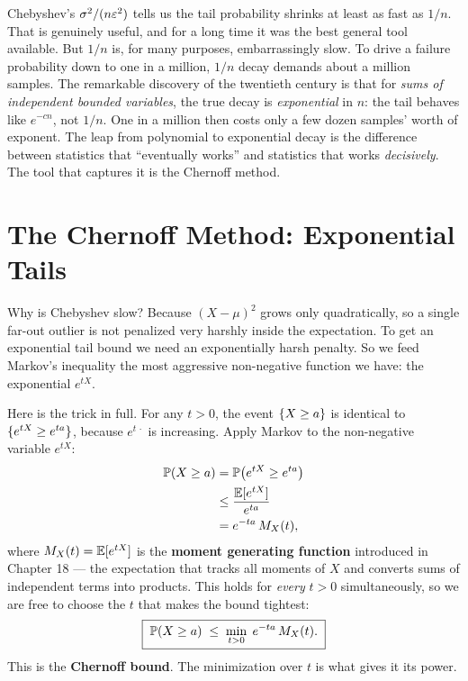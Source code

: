 \begin{aestheticbox}
Chebyshev's $\sigma^2/(n\eps^2)$ tells us the tail probability shrinks at least
as fast as $1/n$. That is genuinely useful, and for a long time it was the best
general tool available. But $1/n$ is, for many purposes, embarrassingly slow.
To drive a failure probability down to one in a million, $1/n$ decay demands
about a million samples. The remarkable discovery of the twentieth century is
that for \emph{sums of independent bounded variables}, the true decay is
\emph{exponential} in $n$: the tail behaves like $e^{-cn}$, not $1/n$. One in a
million then costs only a few dozen samples' worth of exponent. The leap from
polynomial to exponential decay is the difference between statistics that
``eventually works'' and statistics that works \emph{decisively}. The tool
that captures it is the Chernoff method.
\end{aestheticbox}

\section{The Chernoff Method: Exponential Tails}
\label{ch19:chernoff}

Why is Chebyshev slow? Because $(X-\mu)^2$ grows only quadratically, so a
single far-out outlier is not penalized very harshly inside the expectation.
To get an exponential tail bound we need an exponentially harsh penalty. So we
feed Markov's inequality the most aggressive non-negative function we have:
the exponential $e^{tX}$.

Here is the trick in full. For any $t > 0$, the event $\set{X \ge a}$ is
identical to $\set{e^{tX} \ge e^{ta}}$, because $e^{t\,\cdot}$ is increasing.
Apply Markov to the non-negative variable $e^{tX}$:
\begin{align*}
  \P(X \ge a) &= \P\bigl(e^{tX} \ge e^{ta}\bigr) \\
  &\le \frac{\E[e^{tX}]}{e^{ta}} \\
  &= e^{-ta}\,M_X(t),
\end{align*}
where $M_X(t) = \E[e^{tX}]$ is the \textbf{moment generating function}
introduced in Chapter 18 --- the expectation that tracks all moments of $X$
and converts sums of independent terms into products. This holds for
\emph{every} $t > 0$ simultaneously, so we are free to choose the $t$ that
makes the bound tightest:
\[
  \boxed{\;\P(X \ge a) \;\le\; \min_{t>0}\; e^{-ta}\,M_X(t).\;}
\]
This is the \textbf{Chernoff bound}. The minimization over $t$ is what gives it
its power.

